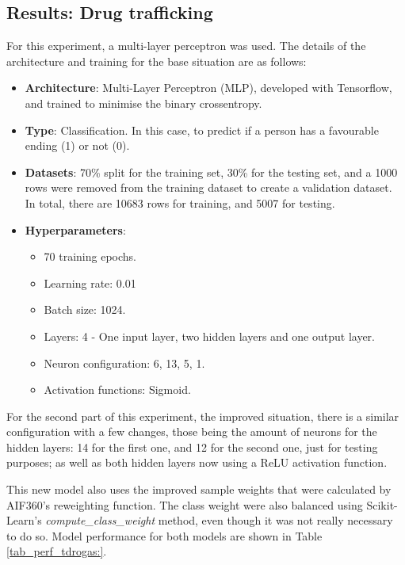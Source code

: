 \documentclass[twoside,11pt]{article}
\begin{document}

\subsection{Results: Drug trafficking}

For this experiment, a multi-layer perceptron was used. The details of the architecture and training for the base situation are as follows:

\begin{itemize}
        \item \textbf{Architecture}: Multi-Layer Perceptron (MLP), developed with Tensorflow, and trained to minimise the binary crossentropy.
        \item \textbf{Type}: Classification. In this case, to predict if a person has a favourable ending (1) or not (0).
        \item \textbf{Datasets}: 70\% split for the training set, 30\% for the testing set, and a 1000 rows were removed from the training dataset to create a validation dataset. In total, there are 10683 rows for training, and 5007 for testing.
        \item \textbf{Hyperparameters}:
            \begin{itemize}
                \item 70 training epochs.
                \item Learning rate: 0.01
                \item Batch size: 1024.
                \item Layers: 4 - One input layer, two hidden layers and one output layer.
                \item Neuron configuration: 6, 13, 5, 1.
                \item Activation functions: Sigmoid.
            \end{itemize}
\end{itemize}

For the second part of this experiment, the improved situation, there is a similar configuration with a few changes, those being the amount of neurons for the hidden layers: 14 for the first one, and 12 for the second one, just for testing purposes; as well as both hidden layers now using a ReLU activation function. 

This new model also uses the improved sample weights that were calculated by AIF360's reweighting function. The class weight were also balanced using Scikit-Learn's \textit{compute\_class\_weight} method, even though it was not really necessary to do so. Model performance for both models are shown in Table \ref{tab_perf_tdrogas:}.
\end{document}
